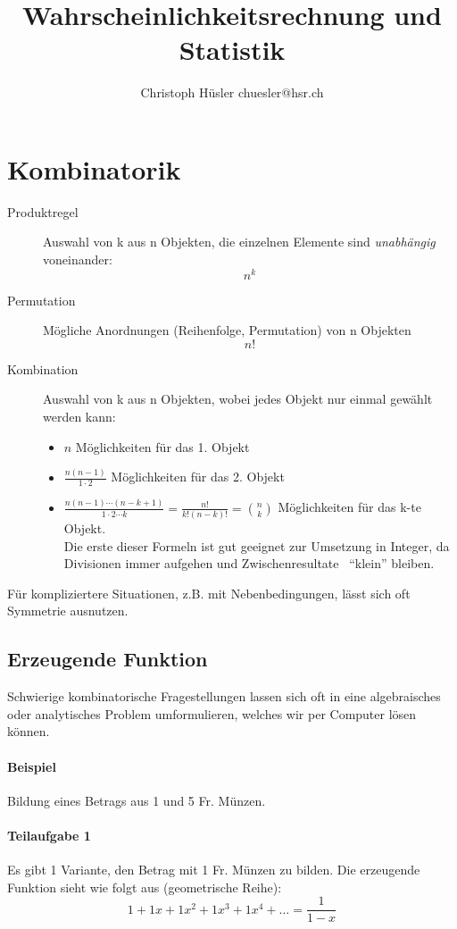 \documentclass[10pt,a4paper]{scrartcl}
\title{Wahrscheinlichkeitsrechnung und Statistik}
\author{Christoph Hüsler \langle chuesler@hsr.ch\rangle} %
\begin{document}
\maketitle

\section{Kombinatorik}
\begin{description}
\item[Produktregel] Auswahl von k aus n Objekten, die einzelnen Elemente sind {\em unabhängig} voneinander: $$n^k$$
\item[Permutation] Mögliche Anordnungen (Reihenfolge, Permutation) von n Objekten $$n!$$
\item[Kombination] Auswahl von k aus n Objekten, wobei jedes Objekt nur einmal gewählt werden kann:
    \begin{itemize}
    \item $n$ Möglichkeiten für das 1. Objekt
    \item $\frac{n(n-1)}{1\cdot2}$ Möglichkeiten für das 2. Objekt
    \item $\frac{n(n-1)\cdots(n-k+1)}{1 \cdot 2 \cdots k} = \frac{n!}{k!(n-k)!} = {n \choose k}$ Möglichkeiten für das k-te Objekt. \\
    Die erste dieser Formeln ist gut geeignet zur Umsetzung in Integer, da Divisionen immer aufgehen und Zwischenresultate  ``klein'' bleiben.
    \end{itemize}
\end{description}

Für kompliziertere Situationen, z.B. mit Nebenbedingungen, lässt sich oft Symmetrie ausnutzen.

\subsection{Erzeugende Funktion}
Schwierige kombinatorische Fragestellungen lassen sich oft in eine algebraisches oder analytisches Problem umformulieren, welches wir per Computer lösen können.

\paragraph{Beispiel} Bildung eines Betrags aus 1 und 5 Fr. Münzen.
\paragraph{Teilaufgabe 1} Es gibt 1 Variante, den Betrag mit 1 Fr. Münzen zu bilden.
Die erzeugende Funktion sieht wie folgt aus (geometrische Reihe): $$1 + 1x + 1x^2 + 1x^3 + 1x^4 + \dots = \frac{1}{1-x}$$ 
\end{document}
